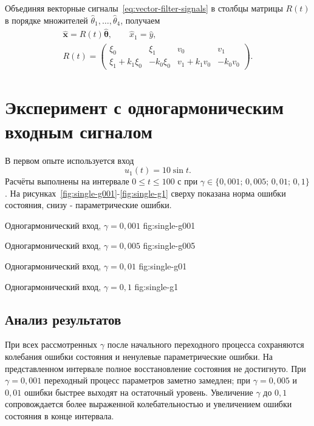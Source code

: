 Объединяя векторные сигналы~\eqref{eq:vector-filter-signals}
в столбцы матрицы $R(t)$ в порядке множителей
$\hat\theta_1,\ldots,\hat\theta_4$, получаем
\begin{equation}
  \begin{gathered}
    \hat{\bm x}=R(t)\hat{\bm\theta},
    \qquad \hat x_1=\hat y,\\[0.4em]
    R(t)=
    \begin{pmatrix}
      \xi_0&\xi_1&v_0&v_1\\
      \xi_1+k_1\xi_0&-k_0\xi_0&
      v_1+k_1v_0&-k_0v_0
    \end{pmatrix}.
  \end{gathered}
  \label{eq:state-estimate}
\end{equation}


\section{Эксперимент с одногармоническим входным сигналом}

В первом опыте используется вход
\begin{equation}
  u_1(t)=10\sin t.
\end{equation}
Расчёты выполнены на интервале $0\le t\le100$ с при
$\gamma\in\{0{,}001;\,0{,}005;\,0{,}01;\,0{,}1\}$.
На рисунках~\ref{fig:single-g001}-\ref{fig:single-g1}
сверху показана норма ошибки состояния, снизу - параметрические ошибки.

  {Одногармонический вход, $\gamma=0{,}001$}
  {fig:single-g001}

  {Одногармонический вход, $\gamma=0{,}005$}
  {fig:single-g005}

  {Одногармонический вход, $\gamma=0{,}01$}
  {fig:single-g01}

  {Одногармонический вход, $\gamma=0{,}1$}
  {fig:single-g1}


\subsection{Анализ результатов}

При всех рассмотренных $\gamma$ после начального переходного процесса
сохраняются колебания ошибки состояния и ненулевые параметрические ошибки.
На представленном интервале полное восстановление состояния не достигнуто.
При $\gamma=0{,}001$ переходный процесс параметров заметно замедлен;
при $\gamma=0{,}005$ и $0{,}01$ ошибки быстрее выходят на остаточный уровень.
Увеличение $\gamma$ до $0{,}1$ сопровождается более выраженной
колебательностью и увеличением ошибки состояния в конце интервала.

